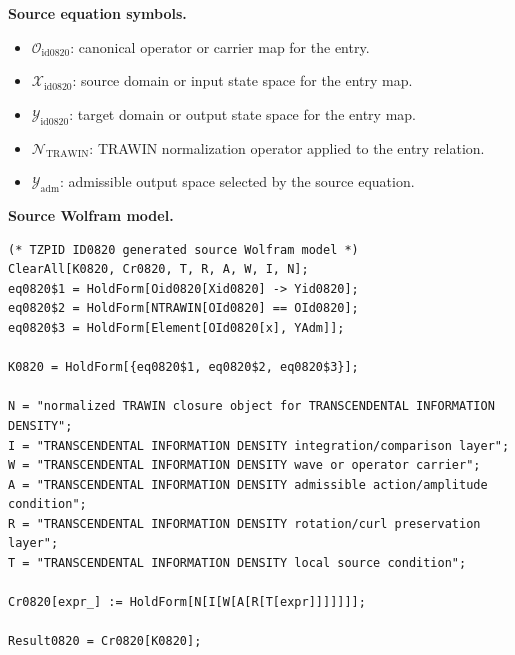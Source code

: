 \begin{minipage}[t]{0.49\linewidth}
\begingroup
\small
\raggedright
\textbf{Source equation symbols.}\par
\begin{itemize}[leftmargin=1.35em,itemsep=1pt,topsep=1pt,parsep=0pt]
    \item $\mathcal{O}_{\mathrm{id0820}}$: canonical operator or carrier map for the entry.
    \item $\mathcal{X}_{\mathrm{id0820}}$: source domain or input state space for the entry map.
    \item $\mathcal{Y}_{\mathrm{id0820}}$: target domain or output state space for the entry map.
    \item $\mathcal{N}_{\mathrm{TRAWIN}}$: TRAWIN normalization operator applied to the entry relation.
    \item $\mathcal{Y}_{\mathrm{adm}}$: admissible output space selected by the source equation.
\end{itemize}
\endgroup
\end{minipage}\hfill
\begin{minipage}[t]{0.47\linewidth}
\begingroup
\scriptsize
\raggedright
\textbf{Source Wolfram model.}\par
\begin{Verbatim}[fontsize=\tiny,breaklines=true,breakanywhere=true]
(* TZPID ID0820 generated source Wolfram model *)
ClearAll[K0820, Cr0820, T, R, A, W, I, N];
eq0820$1 = HoldForm[Oid0820[Xid0820] -> Yid0820];
eq0820$2 = HoldForm[NTRAWIN[OId0820] == OId0820];
eq0820$3 = HoldForm[Element[OId0820[x], YAdm]];

K0820 = HoldForm[{eq0820$1, eq0820$2, eq0820$3}];

N = "normalized TRAWIN closure object for TRANSCENDENTAL INFORMATION DENSITY";
I = "TRANSCENDENTAL INFORMATION DENSITY integration/comparison layer";
W = "TRANSCENDENTAL INFORMATION DENSITY wave or operator carrier";
A = "TRANSCENDENTAL INFORMATION DENSITY admissible action/amplitude condition";
R = "TRANSCENDENTAL INFORMATION DENSITY rotation/curl preservation layer";
T = "TRANSCENDENTAL INFORMATION DENSITY local source condition";

Cr0820[expr_] := HoldForm[N[I[W[A[R[T[expr]]]]]]];

Result0820 = Cr0820[K0820];
\end{Verbatim}
\endgroup
\end{minipage}

